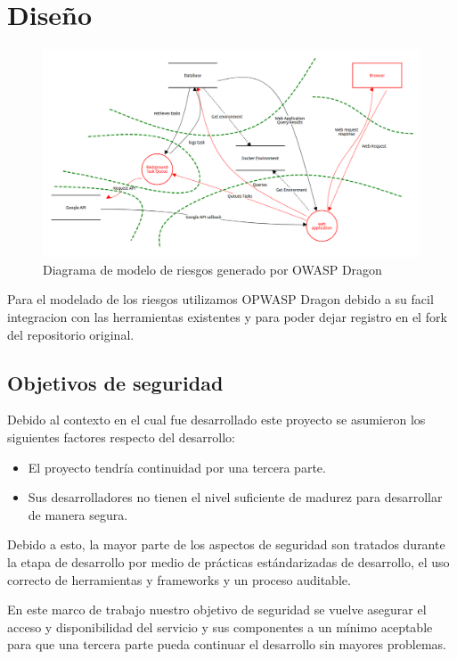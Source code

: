 \section{Diseño}

\begin{figure}
	\centering
	\includegraphics[width=.9\textwidth]{fragments/diagram.png}
	\caption{ Diagrama de modelo de riesgos generado por OWASP Dragon }
\end{figure}

Para el modelado de los riesgos utilizamos OPWASP Dragon debido a su facil integracion con las herramientas existentes y para poder dejar registro en el fork del repositorio original.

\subsection{Objetivos de seguridad}
Debido al contexto en el cual fue desarrollado este proyecto se asumieron los siguientes factores respecto del desarrollo:

\begin{itemize}
    \item El proyecto tendría continuidad por una tercera parte.
    \item Sus desarrolladores no tienen el nivel suficiente de madurez para desarrollar de manera segura.
\end{itemize}

Debido a esto, la mayor parte de los aspectos de seguridad son tratados durante la etapa de desarrollo por medio de prácticas estándarizadas de desarrollo, el uso correcto de herramientas y frameworks y un proceso auditable. 

En este marco de trabajo nuestro objetivo de seguridad se vuelve asegurar el acceso y disponibilidad del servicio y sus componentes a un mínimo aceptable para que una tercera parte pueda continuar el desarrollo sin mayores problemas.

